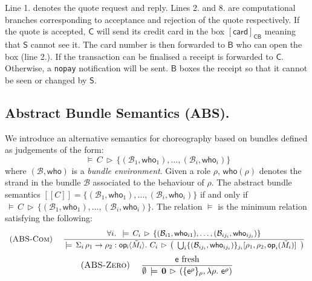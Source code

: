 \documentclass[copyright]{eptcs}
\newcommand{\sembrack}[1]{[\![#1]\!]}
\newcommand{\msgbox}[2]{[#1]_{#2}}
\newcommand{\interact}[4]{#1\rightarrow#2:\mathsf{#3}\langle#4\rangle}
\newcommand{\pfx}{\mathbf.\ }
\newcommand{\INACT}{\mathbf0 }
\newcommand{\who}{\mathsf{who}}
\newcommand{\Rule}[2]{\displaystyle{\frac{#1}{#2}}}
\newcommand{\Did}[1]{(\textsc{#1})}
\newcommand{\NI}{\noindent}
\newcommand{\op}[1]{{\sf #1}}
\newcommand{\semproves}[3]{#1\,\models\,#2\,\rhd\,#3}
\begin{document}
\NI Line 1. denotes the quote request and reply. Lines 2. and 8. are
computational branches corresponding to acceptance and rejection of
the quote respectively. If the quote is accepted, $\mathsf{C}$ will
send its credit card in the box
$\msgbox{\mathsf{card}}{\mathsf{C}\mathsf{B}}$ meaning that
$\mathsf{S}$ cannot see it. The card number is then forwarded to
$\mathsf{B}$ who can open the box (line 2.). If the transaction can be
finalised a receipt is forwarded to $\mathsf{C}$.  Otherwise, a
\texttt{nopay} notification will be sent.  $\mathsf{B}$ boxes the
receipt so that it cannot be seen or changed by $\mathsf{S}$.


\subsection{Abstract Bundle Semantics (ABS).}
We introduce an alternative semantics for choreography based on
bundles defined as judgements of the form:
\[\semproves{} C{ \{(\mathcal B_1,\who_1),\ldots,(\mathcal
  B_i,\who_i)\}}\] where $(\mathcal B,\who{})$ is a {\em bundle
  environment}. Given a role $\rho$, $\who(\rho)$ denotes the strand
in the bundle $\mathcal B$ associated to the behaviour of $\rho$.  The
abstract bundle semantics $\sembrack{C} = { \{(\mathcal
  B_1,\who_1),\ldots,(\mathcal B_i,\who_i)\}}$ if and only if
$\semproves{} C{ \{(\mathcal B_1,\who_1),\ldots,(\mathcal
  B_i,\who_i)\}}$.  The relation $\models$ is the minimum relation
satisfying the following:
\begin{displaymath}
  \begin{array}{rl}
    \Did{ABS-Com}\ 
    &
    \Rule
    {
      \begin{array}{l}
        \forall i\pfx\semproves{}{C_i}{\{(\mathcal B_{i1},\who_{i1}),\ldots,(\mathcal B_{ij_i},\who_{ij_i})\}}
      \end{array}
    }
    {
      \semproves{}
      {\Sigma_i\,\interact{\rho_1}{\rho_2}{op_i}{\tilde M_i}\pfx C_i}
      {
        \left(
          \begin{array}{c}
            \bigcup_i \{(\mathcal B_{ij_i},\who_{ij_i})\}_{j_i}[\rho_1,\rho_2,\op{op}_i(\tilde M_i)]\\
          \end{array}
        \right)
      }
    }
  \end{array}
\end{displaymath}
\begin{displaymath}
  \begin{array}{rl}
  \Did{ABS-Zero}\ 
  &
  \Rule
  {
    \op e\text{ fresh}
  }
  {
    \semproves{\emptyset}{\INACT}{(\{\op e^\rho\}_\rho,\lambda \rho\pfx\op e^\rho)}
  }
  \end{array}
\end{displaymath}
\end{document}
